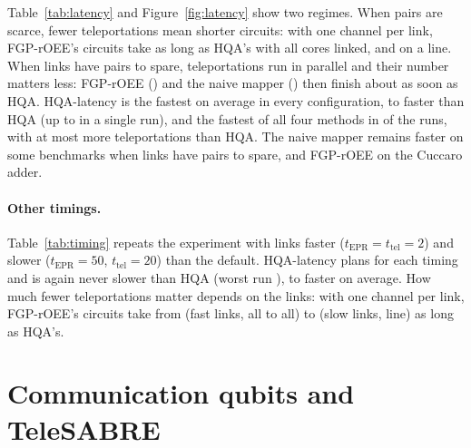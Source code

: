 \documentclass[11pt]{article}
\begin{document}
Table~\ref{tab:latency} and Figure~\ref{fig:latency} show two regimes. When
pairs are scarce, fewer teleportations mean shorter circuits: with one channel
per link, FGP-rOEE's circuits take \fgpSlowerOneChannelAll{} as long as HQA's
with all cores linked, and \fgpSlowerOneChannelLine{} on a line. When links
have pairs to spare, teleportations run in parallel and their number matters
less: FGP-rOEE (\fgpUnlimitedAll{}) and the naive mapper
(\naiveUnlimitedAll{}) then finish about as soon as HQA. HQA-latency is the
fastest on average in every configuration, \latencyMeanWorst{} to
\latencyMeanBest{} faster than HQA (up to \latencyBestRun{} in a single run), and
the fastest of all four methods in \latencyWins{} of the \latencyRuns{} runs,
with at most \latencyExtraTeleportations{} more teleportations than HQA. The
naive mapper remains faster on some benchmarks when links have pairs to
spare, and FGP-rOEE on the Cuccaro adder.

\paragraph{Other timings.} Table~\ref{tab:timing} repeats the experiment
with links faster ($t_\mathrm{EPR} = t_\mathrm{tel} = 2$) and slower
($t_\mathrm{EPR} = 50$, $t_\mathrm{tel} = 20$) than the default. HQA-latency
plans for each timing and is again never slower than HQA (worst run
\timingLatencyWorstRun{}), \timingLatencyMeanWorst{} to
\timingLatencyMeanBest{} faster on average. How much fewer teleportations
matter depends on the links: with one channel per link, FGP-rOEE's circuits
take from \timingFgpOneChannelMin{} (fast links, all to all) to
\timingFgpOneChannelMax{} (slow links, line) as long as HQA's.

\begin{table}[t]
\centering

\caption{As Table~\ref{tab:latency}, with one or unlimited channels per link,
for links faster and slower than the default.}
\label{tab:timing}
\end{table}

\section{Communication qubits and TeleSABRE}
\label{sec:telesabre}
\end{document}
